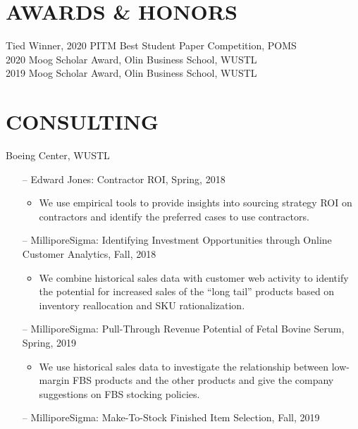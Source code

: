 \documentclass[margin]{res} %
\begin{document}
\begin{resume}

\section{AWARDS \& HONORS} 
    Tied Winner, 2020 PITM Best Student Paper Competition, POMS\\
    2020 Moog Scholar Award, Olin Business School, WUSTL\\
    2019 Moog Scholar Award, Olin Business School, WUSTL\\

\section{CONSULTING}
    Boeing Center, WUSTL
    \begin{itemize}
        \item[--]Edward Jones: Contractor ROI, Spring, 2018
            \begin{itemize}
                \item We use empirical tools to provide insights into sourcing strategy ROI on contractors and identify the preferred cases to use contractors.
            \end{itemize}	
        \item[--]MilliporeSigma: Identifying Investment Opportunities through Online Customer Analytics, Fall, 2018
            \begin{itemize}
                \item We combine historical sales data with customer web activity to identify the potential for increased sales of the “long tail” products based on inventory reallocation and SKU rationalization.   
            \end{itemize}
        \item[--]MilliporeSigma: Pull-Through Revenue Potential of Fetal Bovine Serum, Spring, 2019
            \begin{itemize}
                \item We use historical sales data to investigate the relationship between low-margin FBS products and the other products and give the company suggestions on FBS stocking policies.   
            \end{itemize}
        \item[--]MilliporeSigma: Make-To-Stock Finished Item Selection, Fall, 2019

\end{itemize}
\end{resume}
\end{document}
